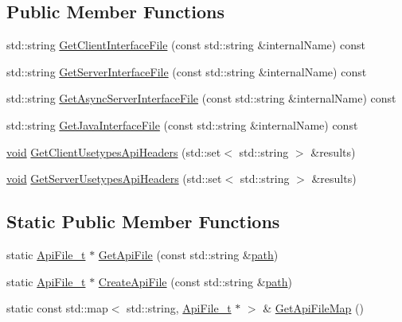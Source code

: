 \subsection*{Public Member Functions}
\begin{DoxyCompactItemize}
\item 
std\+::string \hyperlink{structmodel_1_1_api_file__t_a5301fe03fbf761cd20836f13569eb6a3}{Get\+Client\+Interface\+File} (const std\+::string \&internal\+Name) const 
\item 
std\+::string \hyperlink{structmodel_1_1_api_file__t_a7db0ee4ba2d71dada4ae68013debb9d6}{Get\+Server\+Interface\+File} (const std\+::string \&internal\+Name) const 
\item 
std\+::string \hyperlink{structmodel_1_1_api_file__t_ab230cc292235c1c41775fbb67151294f}{Get\+Async\+Server\+Interface\+File} (const std\+::string \&internal\+Name) const 
\item 
std\+::string \hyperlink{structmodel_1_1_api_file__t_a1e0ed6f88acc0566fbb13e7716175827}{Get\+Java\+Interface\+File} (const std\+::string \&internal\+Name) const 
\item 
\hyperlink{_t_e_m_p_l_a_t_e__cdef_8h_ac9c84fa68bbad002983e35ce3663c686}{void} \hyperlink{structmodel_1_1_api_file__t_a1a8a46b2fbe87a80d3daa36334fff37c}{Get\+Client\+Usetypes\+Api\+Headers} (std\+::set$<$ std\+::string $>$ \&results)
\item 
\hyperlink{_t_e_m_p_l_a_t_e__cdef_8h_ac9c84fa68bbad002983e35ce3663c686}{void} \hyperlink{structmodel_1_1_api_file__t_a9153fdf370ee5b6d8d5ebf927bce0944}{Get\+Server\+Usetypes\+Api\+Headers} (std\+::set$<$ std\+::string $>$ \&results)
\end{DoxyCompactItemize}
\subsection*{Static Public Member Functions}
\begin{DoxyCompactItemize}
\item 
static \hyperlink{structmodel_1_1_api_file__t}{Api\+File\+\_\+t} $\ast$ \hyperlink{structmodel_1_1_api_file__t_ab0c5998f7bdea930b63d041d38f42e75}{Get\+Api\+File} (const std\+::string \&\hyperlink{structmodel_1_1_api_file__t_a98cdd189e475f550e6ca72a2295a29a7}{path})
\item 
static \hyperlink{structmodel_1_1_api_file__t}{Api\+File\+\_\+t} $\ast$ \hyperlink{structmodel_1_1_api_file__t_a4559f81176ca236654916e7d682bd660}{Create\+Api\+File} (const std\+::string \&\hyperlink{structmodel_1_1_api_file__t_a98cdd189e475f550e6ca72a2295a29a7}{path})
\item 
static const std\+::map$<$ std\+::string, \hyperlink{structmodel_1_1_api_file__t}{Api\+File\+\_\+t} $\ast$ $>$ \& \hyperlink{structmodel_1_1_api_file__t_a5bdb1f437ea9f684d37f37ba6f8ad61c}{Get\+Api\+File\+Map} ()
\end{DoxyCompactItemize}
